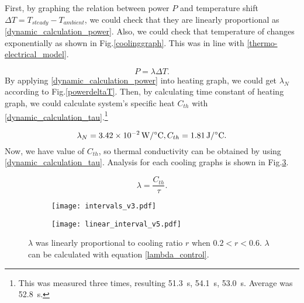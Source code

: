 First, by graphing the relation between power $P$ and temperature shift $\Delta{T}=T_{steady}-T_{ambient}$, we could check that they are linearly proportional as \eqref{dynamic_calculation_power}.
Also, we could check that temperature of \scp changes exponentially as shown in Fig.\ref{coolinggraph}. This was in line with  \eqref{thermo-electrical_model}.

\begin{equation} \label{dynamic_calculation_power}
P = \lambda\Delta{T}.
\end{equation}
By applying \eqref{dynamic_calculation_power} into heating graph, we could get $\lambda_{N}$ according to Fig.\ref{powerdeltaT}. Then, by calculating time constant of heating graph, we could calculate \scp system's specific heat $C_{th}$ with \eqref{dynamic_calculation_tau}.\footnote{This was measured three times, resulting \SI{51.3}{\second}, \SI{54.1}{\second}, \SI{53.0}{\second}. Average was \SI{52.8}{\second}.} 

\begin{equation}
\lambda_{N}=\SI{3.42e-2}{\watt\per\degreeCelsius}, C_{th}=\SI{1.81}{\joule\per\degreeCelsius}. \notag
\end{equation}
Now, we have value of $C_{th}$, so thermal conductivity can be obtained by using \eqref{dynamic_calculation_tau}. Analysis for each cooling graphs is shown in Fig.\ref{analysis_dynamic}.

\begin{equation} \label{dynamic_calculation_tau}
\lambda = \frac{C_{th}}{\tau}.
\end{equation}

\begin{figure}[t]
	\begin{subfigure}[t]{0.52\linewidth}
		\centering\texttt{[image: intervals\_v3.pdf]}
		\caption{\label{dynamic_proportional}}
	\end{subfigure}%
	\begin{subfigure}[t]{0.39\linewidth}
		\centering\texttt{[image: linear\_interval\_v5.pdf]}
		\caption{\label{linear_interval}}
	\end{subfigure}
	\caption[Analysis of dynamic experiment]{ $\lambda$ was linearly proportional to cooling ratio $r$ when $0.2<r<0.6$.   $\lambda$ can be calculated with equation \eqref{lambda_control}.}
	\label{analysis_dynamic}
\end{figure}

